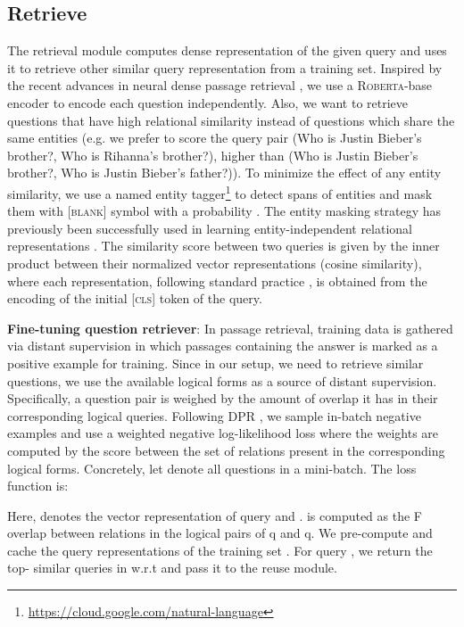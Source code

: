 \documentclass{article}
\newcommand{\roberta}{\textsc{Roberta}\xspace}
\begin{document}
\subsection{Retrieve}
\label{sub:retrieval}
The retrieval module computes dense representation of the given query and uses it to retrieve other similar query representation from a training set. Inspired by the recent advances in neural dense passage retrieval \cite{das2019multi,karpukhin2020dense}, we use a \roberta-base encoder to encode each question independently. Also, we want to retrieve questions that have high relational similarity instead of questions which share the same entities (e.g. we prefer to score the query pair (Who is Justin Bieber's brother?, Who is Rihanna's brother?), higher than (Who is Justin Bieber's brother?, Who is Justin Bieber's father?)). To minimize the effect of any entity similarity, we use a named entity tagger\footnote{\url{https://cloud.google.com/natural-language}} to detect spans of entities and mask them with \textsc{[blank]} symbol with a probability . The entity masking strategy has previously been successfully used in learning entity-independent relational representations \cite{soares2019matching}. The similarity score between two queries is given by the inner product between their normalized vector representations (cosine similarity), where each representation, following standard practice \cite{guu2020realm}, is obtained from the encoding of the initial \textsc{[cls]} token of the query. 

\textbf{Fine-tuning question retriever}: In passage retrieval, training data is gathered via distant supervision in which passages containing the answer is marked as a positive example for training. Since in our setup, we need to retrieve similar questions, we use the available logical forms as a source of distant supervision. Specifically, a question pair is weighed by the amount of overlap it has in their corresponding logical queries. Following DPR \cite{karpukhin2020dense}, we sample in-batch negative examples and use a weighted negative log-likelihood loss where the weights are computed by the  score between the set of relations present in the corresponding logical forms. Concretely, let  denote all questions in a mini-batch. The loss function is:

Here,  denotes the vector representation of query 
 and . 
 is computed as the F overlap between relations in the logical pairs of q and q.
We pre-compute and cache the query representations of the training set . For query , we return the top- similar queries in  w.r.t  and pass it to the reuse module.
\end{document}
